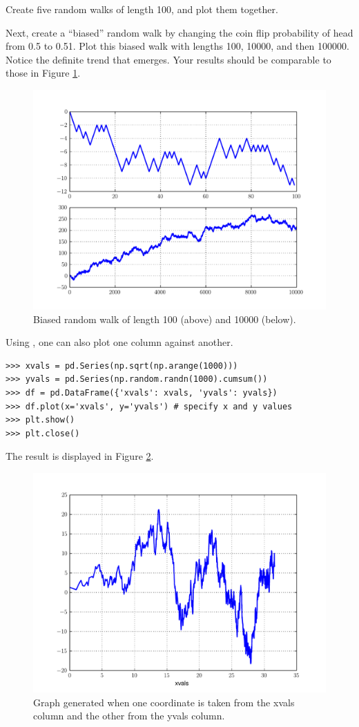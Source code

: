 \begin{problem}
Create five random walks of length 100, and plot them together.

Next, create a ``biased'' random walk by changing the coin flip probability of head from 0.5 to 0.51.
Plot this biased walk with lengths 100, 10000, and then 100000. Notice the definite trend that emerges.
Your results should be comparable to those in Figure \ref{pandas:biasedRandomWalk}.
\end{problem}

\begin{figure}
\centering
\includegraphics[width=.7 \textwidth]{biasedRandomWalk.pdf}
\caption{Biased random walk of length 100 (above) and 10000 (below).}
\label{pandas:biasedRandomWalk}
\end{figure}

Using , one can also plot one column against another.

\begin{lstlisting}
>>> xvals = pd.Series(np.sqrt(np.arange(1000)))
>>> yvals = pd.Series(np.random.randn(1000).cumsum())
>>> df = pd.DataFrame({'xvals': xvals, 'yvals': yvals})
>>> df.plot(x='xvals', y='yvals') # specify x and y values
>>> plt.show()
>>> plt.close()
\end{lstlisting}

The result is displayed in Figure \ref{pandas:dfPlot}.

\begin{figure}
\centering
\includegraphics[width=.7 \textwidth]{dfPlot.pdf}
\caption{ Graph generated when one coordinate is taken from the xvals column and the other from the yvals column.}
\label{pandas:dfPlot}
\end{figure}

